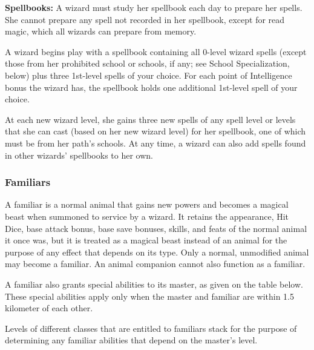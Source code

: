 \textbf{Spellbooks:} A wizard must study her spellbook each day to prepare her spells. She cannot prepare any spell not recorded in her spellbook, except for read magic, which all wizards can prepare from memory.

A wizard begins play with a spellbook containing all 0-level wizard spells (except those from her prohibited school or schools, if any; see School Specialization, below) plus three 1st-level spells of your choice. For each point of Intelligence bonus the wizard has, the spellbook holds one additional 1st-level spell of your choice.

At each new wizard level, she gains three new spells of any spell level or levels that she can cast (based on her new wizard level) for her spellbook, one of which must be from her path's schools. At any time, a wizard can also add spells found in other wizards' spellbooks to her own.

\subsubsection{Familiars}
A familiar is a normal animal that gains new powers and becomes a magical beast when summoned to service by a wizard. It retains the appearance, Hit Dice, base attack bonus, base save bonuses, skills, and feats of the normal animal it once was, but it is treated as a magical beast instead of an animal for the purpose of any effect that depends on its type. Only a normal, unmodified animal may become a familiar. An animal companion cannot also function as a familiar.

A familiar also grants special abilities to its master, as given on the table below. These special abilities apply only when the master and familiar are within 1.5 kilometer of each other.

Levels of different classes that are entitled to familiars stack for the purpose of determining any familiar abilities that depend on the master's level.

